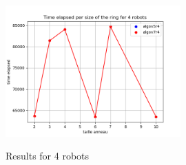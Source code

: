 \documentclass{article}
\begin{document}
\begin{figure}[!h]
    \centering
    \includegraphics[width=0.6\textwidth]{../data/data-phiR24/compar_phiR24_4.png}\label{phiR24r4}
    \caption{Results for 4 robots}
\end{figure}

\newpage
\printbibliography %
\end{document}

